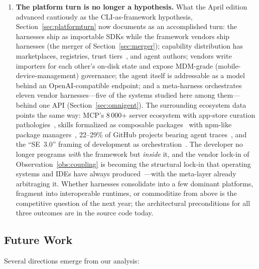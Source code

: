 \documentclass[11pt,a4paper]{article}
\begin{document}
\begin{enumerate}[itemsep=2pt]
  \item \textbf{The platform turn is no longer a hypothesis.}
  What the April edition advanced cautiously as the CLI-as-framework
  hypothesis, Section~\ref{sec:platformturn} now documents as an
  accomplished turn: the harnesses ship as importable SDKs while the
  framework vendors ship harnesses (the merger of
  Section~\ref{sec:merger}); capability distribution has marketplaces,
  registries, trust tiers~\cite{guo2026skillprobe}, and agent authors;
  vendors write importers for each other's on-disk state and expose
  MDM-grade (mobile-device-management) governance; the agent itself is addressable as a model
  behind an OpenAI-compatible endpoint; and a meta-harness orchestrates
  eleven vendor harnesses---five of the systems studied here among
  them---behind one API (Section~\ref{sec:omnigent}).
  The surrounding ecosystem data points the same way: MCP's 8\,000+
  server ecosystem with app-store curation
  pathologies~\cite{guo2025mcpmeasurement}, skills formalized as
  composable packages~\cite{xu2026agentskills} with npm-like package
  managers~\cite{saha2026skilldex}, 22--29\% of GitHub projects bearing
  agent traces~\cite{robbes2026agenticmuch}, and the ``SE~3.0''
  framing of development as orchestration~\cite{li2025se3}.
  The developer no longer programs \emph{with} the framework but
  \emph{inside} it, and the vendor lock-in of
  Observation~\ref{obs:coupling} is becoming the structural lock-in
  that operating systems and IDEs have always
  produced~\cite{kapoor2025platformagents}---with the meta-layer
  already arbitraging it.
  Whether harnesses consolidate into a few dominant platforms, fragment
  into interoperable runtimes, or commoditize from above is the
  competitive question of the next year; the architectural
  preconditions for all three outcomes are in the source code today.
\end{enumerate}

\subsection{Future Work}

Several directions emerge from our analysis:
\end{document}
